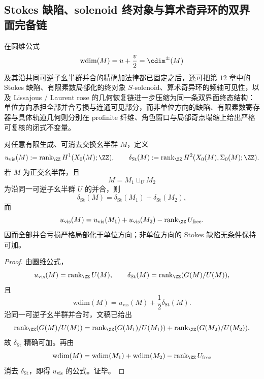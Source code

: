 \subsection{Stokes 缺陷、solenoid 终对象与算术奇异环的双界面完备链}\label{subsec:conclusion-stokes-solenoid-singularring-lissajous-rose-completeness}
在圆维公式
\[
\mathrm{wdim}(M)=u+\frac{v}{2}=\cdim^{\pm}(M)
\]
及其沿共同可逆子幺半群并合的精确加法律都已固定之后，还可把第 \(12\) 章中的 Stokes 缺陷、有限素数局部化的终对象 \(S\)-solenoid、算术奇异环的频轴可见性，以及 Lissajous / Laurent rose 的几何恢复链进一步压缩为同一条双界面终态结构：单位方向承担全部并合亏损与连通可见部分，而非单位方向的缺陷、有限素数寄存器与具体轨道几何则分别在 profinite 纤维、角色窗口与局部奇点塌缩上给出严格可复核的闭式不变量。

\begin{theorem}\label{thm:conclusion-stokes-defect-pure-nonunit-additivity}
对任意有限生成、可消去交换幺半群 \(M\)，定义
\[
u_{\mathrm{vis}}(M):=\operatorname{rank}_{\ZZ}H^1(X_0(M);\ZZ),
\qquad
\delta_{\mathrm{St}}(M):=\operatorname{rank}_{\ZZ}H^2(X_0(M),\Sigma_0(M);\ZZ).
\]
若 \(M\) 为正交幺半群，且
\[
M=M_1\sqcup_U M_2
\]
为沿同一可逆子幺半群 \(U\) 的并合，则
\[
\delta_{\mathrm{St}}(M)=\delta_{\mathrm{St}}(M_1)+\delta_{\mathrm{St}}(M_2),
\]
而
\[
u_{\mathrm{vis}}(M)
=
u_{\mathrm{vis}}(M_1)+u_{\mathrm{vis}}(M_2)-\operatorname{rank}_{\ZZ}U_{\mathrm{free}}.
\]
因而全部并合亏损严格局部化于单位方向；非单位方向的 Stokes 缺陷无条件保持可加。
\end{theorem}
\begin{proof}
由圆维公式，
\[
u_{\mathrm{vis}}(M)=\operatorname{rank}_{\ZZ}U(M),
\qquad
\delta_{\mathrm{St}}(M)=\operatorname{rank}_{\ZZ}(G(M)/U(M)),
\]
且
\[
\mathrm{wdim}(M)=u_{\mathrm{vis}}(M)+\frac{1}{2}\delta_{\mathrm{St}}(M).
\]
沿同一可逆子幺半群并合时，文稿已给出
\[
\operatorname{rank}_{\ZZ}(G(M)/U(M))
=
\operatorname{rank}_{\ZZ}(G(M_1)/U(M_1))
+
\operatorname{rank}_{\ZZ}(G(M_2)/U(M_2)),
\]
故 \(\delta_{\mathrm{St}}\) 精确可加。再由
\[
\mathrm{wdim}(M)=\mathrm{wdim}(M_1)+\mathrm{wdim}(M_2)-\operatorname{rank}_{\ZZ}U_{\mathrm{free}}
\]
消去 \(\delta_{\mathrm{St}}\)，即得 \(u_{\mathrm{vis}}\) 的公式。证毕。
\end{proof}

